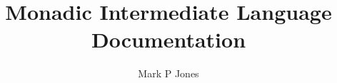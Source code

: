 \documentclass{report}
\begin{document}
\title{Monadic Intermediate Language Documentation}
\author{Mark P Jones}
\maketitle
\tableofcontents




\appendix




\end{document}
